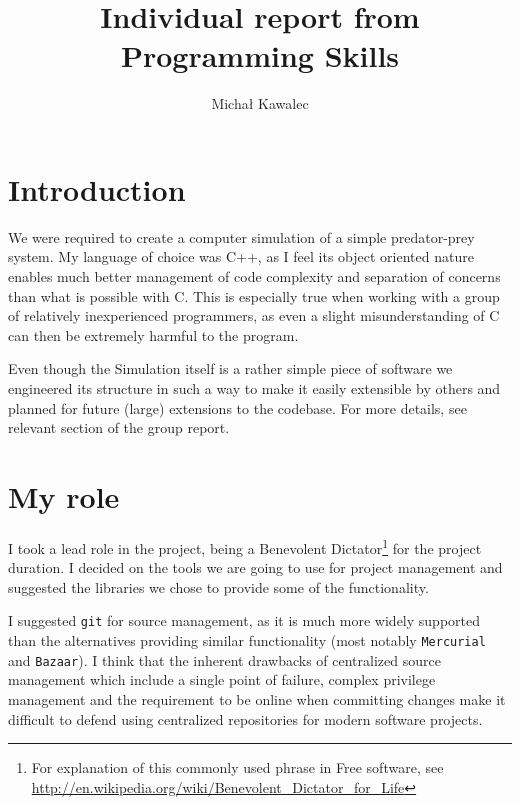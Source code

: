 \documentclass[11pt,a4paper]{article}
\begin{document}
\title{Individual report from Programming Skills}
\author{Michał Kawalec}
\maketitle

\section{Introduction}
We were required to create a computer simulation of a simple predator-prey system.
My language of choice was C++, as I feel its object oriented nature enables much better management of code complexity and separation of concerns than what is possible with C. This is especially true when working with a group of relatively inexperienced programmers, as even a slight misunderstanding of C can then be extremely harmful to the program.

Even though the Simulation itself is a rather simple piece of software we engineered its structure in such a way to make it easily extensible by others and planned for future (large) extensions to the codebase. For more details, see relevant section of the group report.

\section{My role}

I took a lead role in the project, being a Benevolent Dictator\footnote{For explanation of this commonly used phrase in Free software, see \url{http://en.wikipedia.org/wiki/Benevolent_Dictator_for_Life}} for the project duration. I decided on the tools we are going to use for project management and suggested the libraries we chose to provide some of the functionality.

I suggested \texttt{git} for source management, as it is much more widely supported than the alternatives providing similar functionality (most notably \texttt{Mercurial} and \texttt{Bazaar}). I think that the inherent drawbacks of centralized source management which include a single point of failure, complex privilege management and the requirement to be online when committing changes make it difficult to defend using centralized repositories for modern software projects. 
\end{document}
